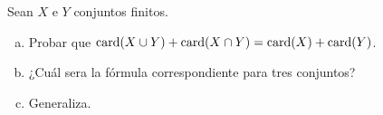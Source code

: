 
Sean $X$ e $Y$ conjuntos finitos.
\begin{enumerate}[a)]
	\item Probar que $\operatorname{card}(X \cup Y) + \operatorname{card}(X \cap Y) = \operatorname{card}(X) + \operatorname{card}(Y)$.
	\item ¿Cuál sera la fórmula correspondiente para tres conjuntos?
	\item Generaliza.
\end{enumerate}